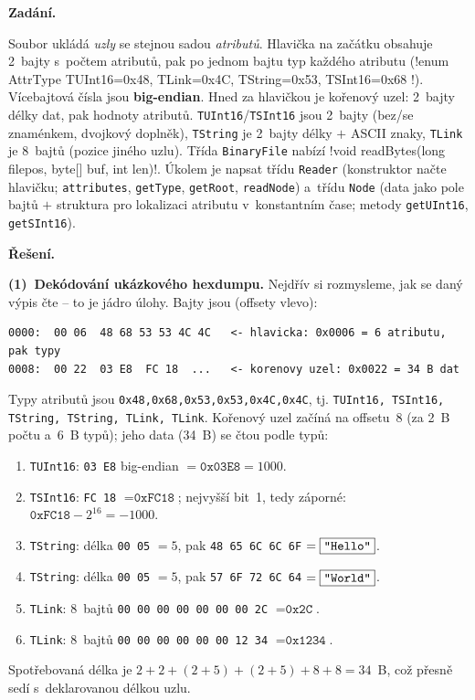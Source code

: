 \begin{priklad}
\par
\textbf{Zadání.}\par
Soubor ukládá \emph{uzly} se stejnou sadou \emph{atributů}. Hlavička na začátku obsahuje 2~bajty s~počtem atributů, pak po jednom bajtu typ každého atributu (\cd!enum AttrType { TUInt16=0x48, TLink=0x4C, TString=0x53, TSInt16=0x68 }!). Vícebajtová čísla jsou \textbf{big-endian}. Hned za hlavičkou je kořenový uzel: 2~bajty délky dat, pak hodnoty atributů. \texttt{TUInt16}/\texttt{TSInt16} jsou 2~bajty (bez/se znaménkem, dvojkový doplněk), \texttt{TString} je 2~bajty délky $+$ ASCII znaky, \texttt{TLink} je 8~bajtů (pozice jiného uzlu). Třída \texttt{BinaryFile} nabízí \cd!void readBytes(long filepos, byte[] buf, int len)!. Úkolem je napsat třídu \texttt{Reader} (konstruktor načte hlavičku; \texttt{attributes}, \texttt{getType}, \texttt{getRoot}, \texttt{readNode}) a~třídu \texttt{Node} (data jako pole bajtů $+$ struktura pro lokalizaci atributu v~konstantním čase; metody \texttt{getUInt16}, \texttt{getSInt16}).

\medskip
\textbf{Řešení.}\par
\textbf{(1)~Dekódování ukázkového hexdumpu.} Nejdřív si rozmysleme, jak se daný výpis čte -- to je jádro úlohy. Bajty jsou (offsety vlevo):
\begin{lstlisting}
0000:  00 06  48 68 53 53 4C 4C   <- hlavicka: 0x0006 = 6 atributu, pak typy
0008:  00 22  03 E8  FC 18  ...   <- korenovy uzel: 0x0022 = 34 B dat
\end{lstlisting}
Typy atributů jsou \texttt{0x48,0x68,0x53,0x53,0x4C,0x4C}, tj. \texttt{TUInt16, TSInt16, TString, TString, TLink, TLink}. Kořenový uzel začíná na offsetu~8 (za 2~B počtu a~6~B typů); jeho data (34~B) se čtou podle typů:
\begin{enumerate}
\item \texttt{TUInt16}: \texttt{03 E8} big-endian $=\texttt{0x03E8}=\boxed{1000}$.
\item \texttt{TSInt16}: \texttt{FC 18} $=\texttt{0xFC18}$; nejvyšší bit~1, tedy záporné: $\texttt{0xFC18}-2^{16}=\boxed{-1000}$.
\item \texttt{TString}: délka \texttt{00 05} $=5$, pak \texttt{48 65 6C 6C 6F} $=\boxed{\text{\texttt{"Hello"}}}$.
\item \texttt{TString}: délka \texttt{00 05} $=5$, pak \texttt{57 6F 72 6C 64} $=\boxed{\text{\texttt{"World"}}}$.
\item \texttt{TLink}: 8~bajtů \texttt{00\,00\,00\,00\,00\,00\,00\,2C} $=\boxed{\texttt{0x2C}}$.
\item \texttt{TLink}: 8~bajtů \texttt{00\,00\,00\,00\,00\,00\,12\,34} $=\boxed{\texttt{0x1234}}$.
\end{enumerate}
Spotřebovaná délka je $2+2+(2{+}5)+(2{+}5)+8+8=34$~B, což přesně sedí s~deklarovanou délkou uzlu.


\end{priklad}
